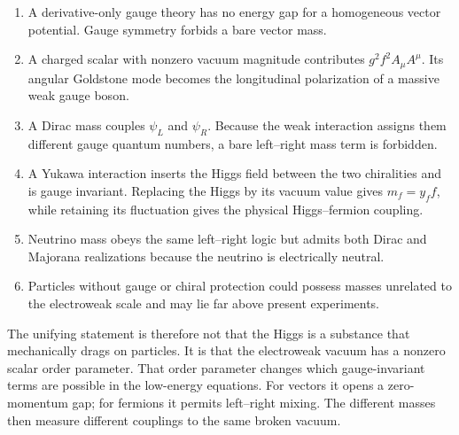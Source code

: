 \begin{enumerate}
  \item A derivative-only gauge theory has no energy gap for a homogeneous
  vector potential. Gauge symmetry forbids a bare vector mass.
  \item A charged scalar with nonzero vacuum magnitude contributes
  \(g^2f^2A_\mu A^\mu\). Its angular Goldstone mode becomes the longitudinal
  polarization of a massive weak gauge boson.
  \item A Dirac mass couples \(\psi_L\) and \(\psi_R\). Because the weak
  interaction assigns them different gauge quantum numbers, a bare
  left--right mass term is forbidden.
  \item A Yukawa interaction inserts the Higgs field between the two
  chiralities and is gauge invariant. Replacing the Higgs by its vacuum
  value gives \(m_f=y_ff\), while retaining its fluctuation gives the
  physical Higgs--fermion coupling.
  \item Neutrino mass obeys the same left--right logic but admits both Dirac
  and Majorana realizations because the neutrino is electrically neutral.
  \item Particles without gauge or chiral protection could possess masses
  unrelated to the electroweak scale and may lie far above present
  experiments.
\end{enumerate}

The unifying statement is therefore not that the Higgs is a substance that
mechanically drags on particles. It is that the electroweak vacuum has a
nonzero scalar order parameter. That order parameter changes which
gauge-invariant terms are possible in the low-energy equations. For vectors
it opens a zero-momentum gap; for fermions it permits left--right mixing.
The different masses then measure different couplings to the same broken
vacuum.
